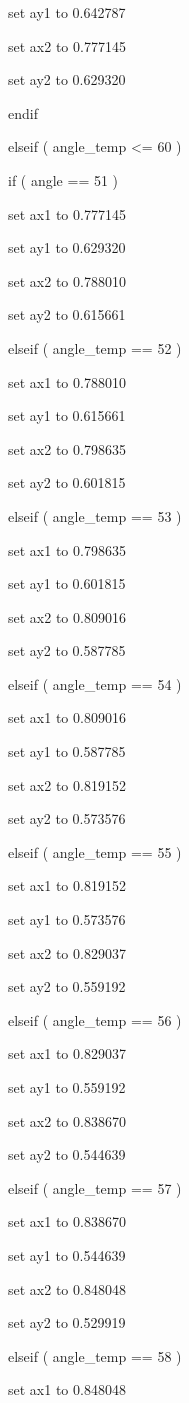 \documentclass[
]{article}
\begin{document}
set ay1 to 0.642787

set ax2 to 0.777145

set ay2 to 0.629320

endif

elseif ( angle\_temp \textless= 60 )

if ( angle == 51 )

set ax1 to 0.777145

set ay1 to 0.629320

set ax2 to 0.788010

set ay2 to 0.615661

elseif ( angle\_temp == 52 )

set ax1 to 0.788010

set ay1 to 0.615661

set ax2 to 0.798635

set ay2 to 0.601815

elseif ( angle\_temp == 53 )

set ax1 to 0.798635

set ay1 to 0.601815

set ax2 to 0.809016

set ay2 to 0.587785

elseif ( angle\_temp == 54 )

set ax1 to 0.809016

set ay1 to 0.587785

set ax2 to 0.819152

set ay2 to 0.573576

elseif ( angle\_temp == 55 )

set ax1 to 0.819152

set ay1 to 0.573576

set ax2 to 0.829037

set ay2 to 0.559192

elseif ( angle\_temp == 56 )

set ax1 to 0.829037

set ay1 to 0.559192

set ax2 to 0.838670

set ay2 to 0.544639

elseif ( angle\_temp == 57 )

set ax1 to 0.838670

set ay1 to 0.544639

set ax2 to 0.848048

set ay2 to 0.529919

elseif ( angle\_temp == 58 )

set ax1 to 0.848048
\end{document}
